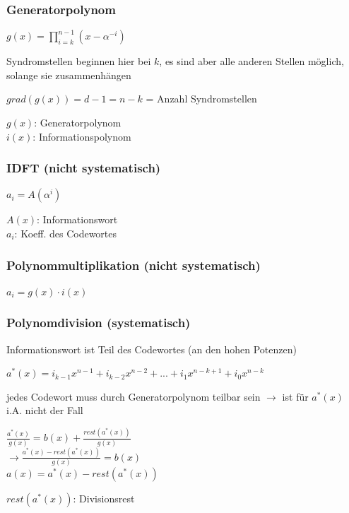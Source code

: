 \subsubsection{Generatorpolynom}

$\displaystyle{
    g(x) = \prod_{i=k}^{n-1} \left(x - \alpha^{-i}\right)
}$

Syndromstellen beginnen hier bei $k$, es sind aber alle anderen Stellen möglich, solange sie zusammenhängen

$grad(g(x)) = d-1 = n-k$ = Anzahl Syndromstellen

$g(x)$: Generatorpolynom\\
$i(x)$: Informationspolynom

\subsubsection{IDFT (nicht systematisch)}

$\displaystyle{
    a_i = A(\alpha^i)
}$

$A(x)$: Informationswort\\
$a_i$: Koeff. des Codewortes

\subsubsection{Polynommultiplikation (nicht systematisch)}

$\displaystyle{
    a_i = g(x) \cdot i(x)
}$

\subsubsection{Polynomdivision (systematisch)}

Informationswort ist Teil des Codewortes (an den hohen Potenzen)

$\displaystyle{
    a^*(x) = i_{k-1} x^{n-1} + i_{k-2} x^{n-2} + ... + i_1 x^{n-k+1} + i_0 x^{n-k}
}$

jedes Codewort muss durch Generatorpolynom teilbar sein $\rightarrow$ ist
für $a^*(x)$ i.A. nicht der Fall

$\displaystyle{
    \frac{a^*(x)}{g(x)} = b(x) + \frac{rest(a^*(x))}{g(x)}
}$\\
$\displaystyle{
    \rightarrow \frac{a^*(x) - rest\left(a^*(x)\right)}{g(x)} = b(x)
}$\\
$\displaystyle{
    a(x) = a^*(x) - rest\left(a^*(x)\right)
}$

$rest\left(a^*(x)\right)$: Divisionsrest


